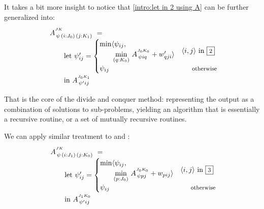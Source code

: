 \medskip
It takes a bit more insight to notice that \eqref{intro:let in 2 using A} can be further
generalized into:
%
\begin{equation}\LeftEqNo
\renewcommand\arraystretch{1.5}
\begin{array}{l@{}l}
	A^{^{JK}}_{\,\psi\,(i : J_0)\,(j : K_1)} ~=~ \\
	\qquad
	\textrm{let}~\psi'_{ij} = \begin{cases}
	  \begin{array}{@{}l@{}l@{}}\min\langle & \psi_{ij}, \\ & \!\underset{(q:K_0)}\min ~ A^{^{J_0K_0}}_{\,\psi iq} + w'_{qji}\rangle\end{array} & \langle i,j\rangle\mbox{ in }\qbox2 \\
	  \psi_{ij} & \otherwise
	\end{cases} \\
	\qquad\textrm{in}~
	A^{^{J_0K_1}}_{\,\psi' ij}
\end{array}
\label{intro:let in A 2}
\end{equation}

That is the core of the divide and conquer method: representing the output as a combination
of solutions to sub-problems, yielding an algorithm that is essentially
a recursive routine, or a set of mutually recursive routines. 

\medskip
We can apply similar treatment to  and :
%
\begin{equation}\LeftEqNo
\renewcommand\arraystretch{1.5}
\begin{array}{l@{}l}
	A^{^{JK}}_{\,\psi\,(i : J_1)\,(j : K_0)} ~=~ \\
	\qquad
	\textrm{let}~\psi'_{ij} = \begin{cases} 
	  \begin{array}{@{}l@{}l@{}}\min\langle & \psi_{ij}, \\ & \!\underset{(p:J_0)}\min ~ A^{^{J_0K_0}}_{\,\psi pj} + w_{pij}\rangle \end{array} & \langle i,j\rangle\mbox{ in }\qbox3 \\
	  \psi_{ij} & \otherwise \\
	\end{cases} \\
	\qquad\textrm{in}~
	A^{^{J_1K_0}}_{\,\psi' ij}
\end{array}
\label{intro:let in A 3}
\end{equation}

